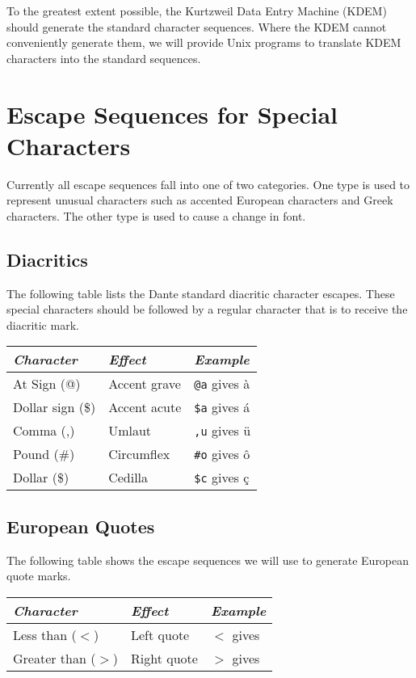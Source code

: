 To the greatest extent possible, the Kurtzweil Data Entry Machine
(KDEM) should generate the standard character sequences.
Where the KDEM cannot conveniently generate them, we will
provide Unix programs to translate KDEM characters into the standard
sequences.

\section{Escape Sequences for Special Characters}
Currently all escape sequences fall into one of two categories.
One type is used to represent unusual characters such as accented European
characters and Greek characters.
The other type is used to cause a change in font.

\subsection{Diacritics}
The following table lists the Dante standard diacritic
character escapes.
These special characters should be followed
by a regular character that is to receive the diacritic mark.
\begin{center}
  \begin{tabular}{lll}
    {\em Character} & {\em Effect} & {\em Example} \\ \hline
    At Sign (@)     & Accent grave & {\tt @a} gives \`{a} \\
    Dollar sign (\$) & Accent acute & {\tt \$a} gives \'{a} \\
    Comma (,)       & Umlaut       & {\tt ,u} gives \"{u} \\
    Pound (\#)	    & Circumflex   & {\tt \#o} gives \^{o} \\
    Dollar (\$)     & Cedilla      & {\tt \$c} gives \c{c} \\
  \end{tabular}
\end{center}

\subsection{European Quotes}
The following table shows the escape sequences we will use to generate
European quote marks.
\begin{center}
  \begin{tabular}{lll}
    {\em Character} & {\em Effect} & {\em Example} \\ \hline
    Less than ($<$)   & Left quote   & {\tt $<$} gives \< \\
    Greater than ($>$) & Right quote & {\tt $>$} gives \> \\
  \end{tabular}
\end{center}

